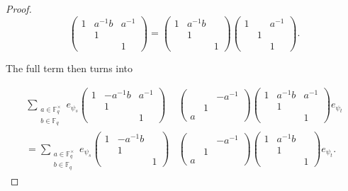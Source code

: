 \documentclass[12pt,reqno]{amsart}
\theoremstyle{definition}
\theoremstyle{remark}
\numberwithin{equation}{section}
\begin{document}
\begin{proof}
    \begin{equation*}
        \begin{pmatrix}
            1 & a^{-1}b & a^{-1} \\
             & 1 & \\
            & & 1
        \end{pmatrix} = \begin{pmatrix}
            1 & a^{-1}b & \\
            & 1 & \\
            & & 1
        \end{pmatrix} \begin{pmatrix}
            1 & & a^{-1}\\
            & 1 & \\
            & & 1
        \end{pmatrix}.
    \end{equation*}

    The full term then turns into

    \begin{align*}
        \sum_{\substack{a \in \mathbb{F}_q^\times\\b \in \mathbb{F}_q}}e_{\psi_s} \begin{pmatrix}
            1 & -a^{-1}b & a^{-1} \\
            & 1 & \\
            & & 1
        \end{pmatrix}& \begin{pmatrix}
            & & -a^{-1}\\
            & 1 &\\
            a & &
        \end{pmatrix} \begin{pmatrix}
            1 & a^{-1}b & a^{-1}\\
            & 1 & \\
            & & 1
        \end{pmatrix} e_{\psi_t}\\
        = \sum_{\substack{a \in \mathbb{F}_q^\times\\b \in \mathbb{F}_q}}e_{\psi_s}\begin{pmatrix}
            1 & -a^{-1}b & \\
            & 1 & \\
            & & 1
        \end{pmatrix}&\begin{pmatrix}
            & & -a^{-1}\\
            & 1 &\\
            a & &
        \end{pmatrix} \begin{pmatrix}
            1 & a^{-1}b &\\
            & 1 & \\
            & & 1
        \end{pmatrix} e_{\psi_t}.
    \end{align*}


\end{proof}
\end{document}
